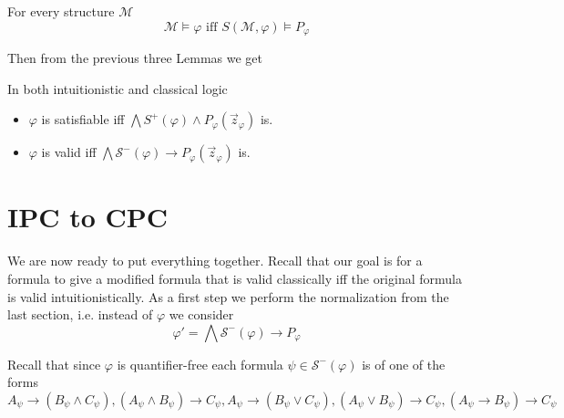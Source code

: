 \documentclass[a4paper,UKenglish,cleveref, autoref, thm-restate]{lipics-v2021}
\begin{document}
\begin{lemma}
	For every structure $\mathcal M$
	$$\mathcal M\models \varphi\text{ iff }S(\mathcal M, \varphi)\models P_\varphi$$
\end{lemma}

Then from the previous three Lemmas we get

\begin{corollary}\label{equivalid}
	In both intuitionistic and classical logic
	\begin{itemize}
		\item $\varphi$ is satisfiable iff $\mathcal \bigwedge S^+(\varphi)\wedge P_\varphi(\vec z_\varphi)$ is.
		\item $\varphi$ is valid iff $\bigwedge\mathcal S^-(\varphi)\to P_\varphi(\vec z_\varphi)$ is.
	\end{itemize}
\end{corollary}

\section{IPC to CPC}

We are now ready to put everything together. Recall that our goal is for a formula to give a modified formula that is valid classically iff the original formula is valid intuitionistically. As a first step we perform the normalization from the last section, i.e. instead of $\varphi$ we consider $$\varphi' = \bigwedge \mathcal S^-(\varphi)\to P_\varphi$$

Recall that since $\varphi$ is quantifier-free each formula $\psi\in\mathcal S^-(\varphi)$ is of one of the forms
$$A_\psi\to (B_\psi\wedge C_\psi), (A_\psi\wedge B_\psi)\to C_\psi, A_\psi\to (B_\psi\vee C_\psi), (A_\psi\vee B_\psi)\to C_\psi, (A_\psi\to B_\psi)\to C_\psi$$
\end{document}
